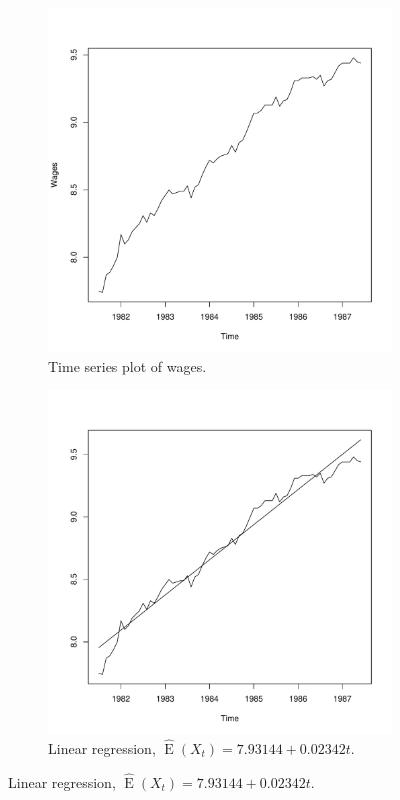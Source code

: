 \documentclass[10pt]{fphw}
\theoremstyle{definition}
\newcommand{\expect}{\operatorname{E}}
\begin{document}
\begin{enumerate}
    \begin{figure}
    \begin{subfigure}{.5\textwidth}
    \centering
    \includegraphics[width=.85\linewidth]{plot3_a_raw}
    \caption{Time series plot of wages.}
    \label{fig:plot3a}
    \end{subfigure}
    \begin{subfigure}{.5\textwidth}
        \centering
        \includegraphics[width=.85\linewidth]{plot3_b_lin_fit}
        \caption{Linear regression, $\hat{\expect}(X_t)=7.93144 + 0.02342 t$.}
        \label{fig:plot3b}
    \end{subfigure}


\end{figure}
\end{enumerate}
\end{document}
